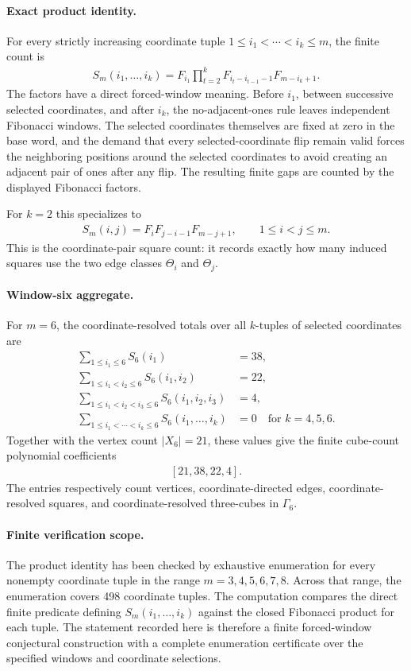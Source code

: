 \paragraph{Exact product identity.}
For every strictly increasing coordinate tuple $1 \le i_1 < \cdots < i_k \le m$, the finite count is
$$
\begin{aligned}
S_m(i_1,\ldots,i_k)
  =F_{i_1}\prod_{t=2}^{k}F_{i_t-i_{t-1}-1}F_{m-i_k+1}.
\end{aligned}
$$
The factors have a direct forced-window meaning. Before $i_1$, between successive selected coordinates, and after $i_k$, the no-adjacent-ones rule leaves independent Fibonacci windows. The selected coordinates themselves are fixed at zero in the base word, and the demand that every selected-coordinate flip remain valid forces the neighboring positions around the selected coordinates to avoid creating an adjacent pair of ones after any flip. The resulting finite gaps are counted by the displayed Fibonacci factors.

For $k=2$ this specializes to
$$
\begin{aligned}
S_m(i,j)=F_iF_{j-i-1}F_{m-j+1},
\qquad 1 \le i<j\le m.
\end{aligned}
$$
This is the coordinate-pair square count: it records exactly how many induced squares use the two edge classes $\Theta_i$ and $\Theta_j$.

\paragraph{Window-six aggregate.}
For $m=6$, the coordinate-resolved totals over all $k$-tuples of selected coordinates are
$$
\begin{aligned}
\sum_{1 \le i_1 \le 6}S_6(i_1)&=38,\\
\sum_{1 \le i_1<i_2 \le 6}S_6(i_1,i_2)&=22,\\
\sum_{1 \le i_1<i_2<i_3 \le 6}S_6(i_1,i_2,i_3)&=4,\\
\sum_{1 \le i_1<\cdots<i_k \le 6}S_6(i_1,\ldots,i_k)&=0
\quad \text{for } k=4,5,6.
\end{aligned}
$$
Together with the vertex count $|X_6|=21$, these values give the finite cube-count polynomial coefficients
$$
\begin{aligned}
[21,38,22,4].
\end{aligned}
$$
The entries respectively count vertices, coordinate-directed edges, coordinate-resolved squares, and coordinate-resolved three-cubes in $\Gamma_6$.

\paragraph{Finite verification scope.}
The product identity has been checked by exhaustive enumeration for every nonempty coordinate tuple in the range $m=3,4,5,6,7,8$. Across that range, the enumeration covers 498 coordinate tuples. The computation compares the direct finite predicate defining $S_m(i_1,\ldots,i_k)$ against the closed Fibonacci product for each tuple. The statement recorded here is therefore a finite forced-window conjectural construction with a complete enumeration certificate over the specified windows and coordinate selections.

